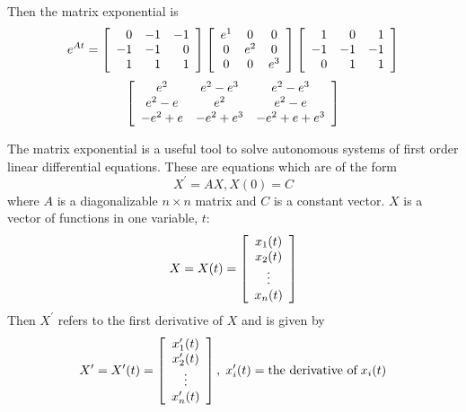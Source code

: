 \begin{solution}
Then the matrix exponential is 
\begin{equation*}
e^{At} = \left[ 
\begin{array}{rrr}
0 & -1 & -1 \\ 
-1 & -1 & 0 \\ 
1 & 1 & 1
\end{array}
\right] \left[ 
\begin{array}{ccc}
e^{1} & 0 & 0 \\ 
0 & e^{2} & 0 \\ 
0 & 0 & e^{3}
\end{array}
\right] \left[ 
\begin{array}{rrr}
1 & 0 & 1 \\ 
-1 & -1 & -1 \\ 
0 & 1 & 1
\end{array}
\right]
\end{equation*}
\begin{equation*}
\left[ 
\begin{array}{ccc}
e^{2} & e^{2}-e^{3} & e^{2}-e^{3} \\ 
e^{2}-e & e^{2} & e^{2}-e \\ 
-e^{2}+e & -e^{2}+e^{3} & -e^{2}+e+e^{3}
\end{array}
\right] 
\end{equation*}
\end{solution}

The matrix exponential is a useful tool to solve autonomous
systems of first order linear differential equations. These are equations
which are of the form 
\begin{equation*}
X^{\prime }=AX, X(0) = C
\end{equation*}
where $A $ is a diagonalizable $n\times n$ matrix and $C$ is a constant vector. $X$ is a vector of functions in one variable, $t$:
\begin{equation*}
X = X(t) = \left[ \begin{array}{c}
x_1(t) \\
x_2(t) \\
\vdots \\
x_n(t) 
\end{array}
\right]
\end{equation*}
Then $X^{\prime }$ refers to the first derivative of $X$ and is given by 
\begin{equation*}
X^{\prime} = X^{\prime}(t) = \left[ \begin{array}{c}
x_1^{\prime}(t) \\
x_2^{\prime}(t) \\
\vdots \\
x_n^{\prime}(t) 
\end{array}
\right], \; x_i^{\prime}(t) = \mbox{the derivative of}\; x_i(t)
\end{equation*}

